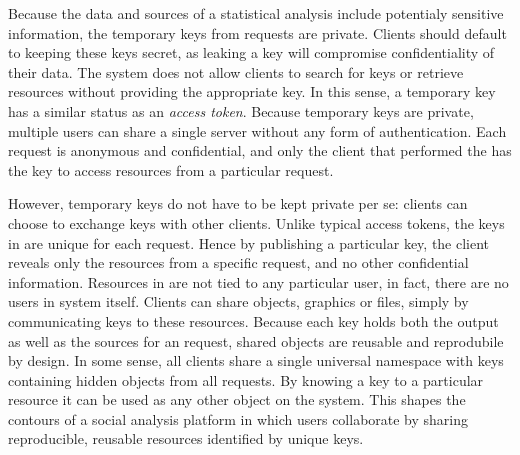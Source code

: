 Because the data and sources of a statistical analysis include potentialy sensitive information, the temporary keys from \RPC requests are private. Clients should default to keeping these keys secret, as leaking a key will compromise confidentiality of their data. The system does not allow clients to search for keys or retrieve resources without providing the appropriate key. In this sense, a temporary key has a similar status as an \emph{access token}. Because temporary keys are private, multiple users can share a single \OpenCPU server without any form of authentication. Each request is anonymous and confidential, and only the client that performed the \RPC has the key to access resources from a particular request.

However, temporary keys do not have to be kept private per se: clients can choose to exchange keys with other clients. Unlike typical access tokens, the keys in \OpenCPU are unique for each request. Hence by publishing a particular key, the client reveals only the resources from a specific \RPC request, and no other confidential information. Resources in \OpenCPU are not tied to any particular user, in fact, there are no users in \OpenCPU system itself. Clients can share objects, graphics or files, simply by communicating keys to these resources. Because each key holds both the output as well as the sources for an \RPC request, shared objects are reusable and reprodubile by design. In some sense, all clients share a single universal namespace with keys containing hidden objects from all \RPC requests. By knowing a key to a particular resource it can be used as any other object on the system. This shapes the contours of a social analysis platform in which users collaborate by sharing reproducible, reusable resources identified by unique keys.